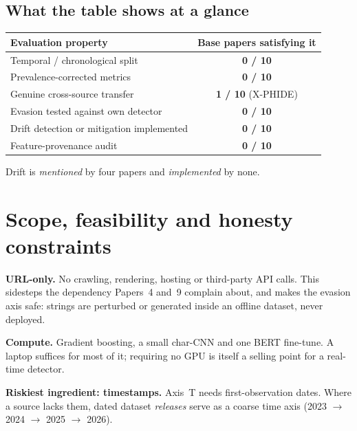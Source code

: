 \documentclass[10pt,a4paper]{article}
\begin{document}
\vspace{3mm}
\subsection*{What the table shows at a glance}

\begin{center}
\begin{tabular}{@{}L{85mm} c@{}}
\toprule
\textbf{Evaluation property} & \textbf{Base papers satisfying it}\\
\midrule
Temporal / chronological split & \textbf{0 / 10}\\
Prevalence-corrected metrics & \textbf{0 / 10}\\
Genuine cross-source transfer & \textbf{1 / 10} (X-PHIDE)\\
Evasion tested against own detector & \textbf{0 / 10}\\
Drift detection or mitigation implemented & \textbf{0 / 10}\\
Feature-provenance audit & \textbf{0 / 10}\\
\bottomrule
\end{tabular}
\end{center}

\noindent Drift is \emph{mentioned} by four papers and \emph{implemented} by none.

\clearpage
\section{Scope, feasibility and honesty constraints}

\textbf{URL-only.} No crawling, rendering, hosting or third-party API calls. This sidesteps the
dependency Papers~4 and~9 complain about, and makes the evasion axis safe: strings are perturbed
or generated inside an offline dataset, never deployed.

\textbf{Compute.} Gradient boosting, a small char-CNN and one BERT fine-tune. A laptop suffices
for most of it; requiring no GPU is itself a selling point for a real-time detector.

\textbf{Riskiest ingredient: timestamps.} Axis~T needs first-observation dates. Where a source
lacks them, dated dataset \emph{releases} serve as a coarse time axis (2023 $\rightarrow$ 2024
$\rightarrow$ 2025 $\rightarrow$ 2026).

\vspace{2mm}
\noindent{}
\end{document}
